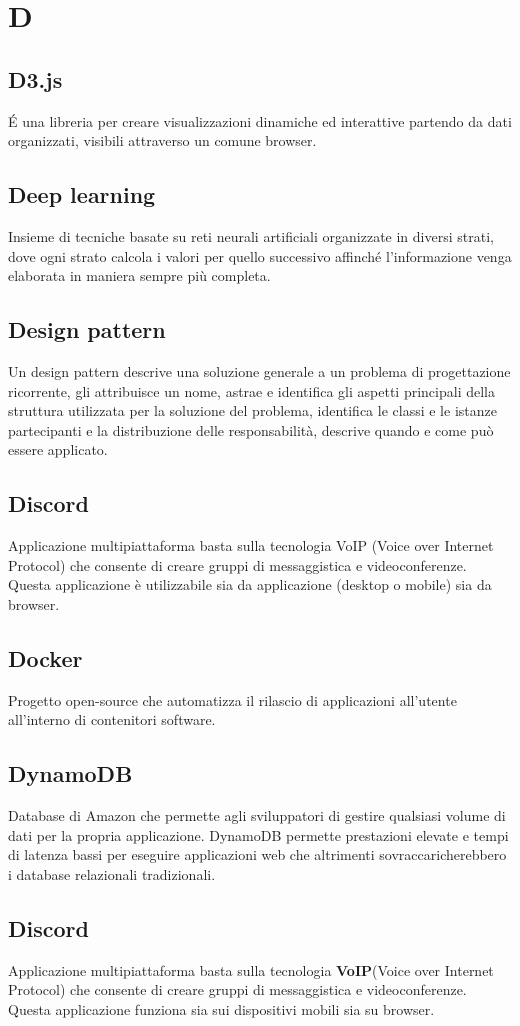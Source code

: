 \section*{D}
\markright{}
\subsection*{D3.js}
\'E una libreria  per creare visualizzazioni dinamiche ed interattive partendo da dati organizzati, visibili attraverso un comune browser.

\subsection*{Deep learning}
Insieme di tecniche basate su reti neurali artificiali organizzate in diversi strati, dove ogni strato calcola i valori per quello successivo affinché l'informazione venga elaborata in maniera sempre più completa.

\subsection*{Design pattern}
Un design pattern descrive una soluzione generale a un problema di progettazione ricorrente, gli attribuisce un nome, astrae e identifica gli aspetti principali della struttura utilizzata per la soluzione del problema, identifica le classi e le istanze partecipanti e la distribuzione delle responsabilità, descrive quando e come può essere applicato. 

\subsection*{Discord}
Applicazione multipiattaforma basta sulla tecnologia VoIP (Voice over Internet Protocol) che consente di creare gruppi di messaggistica e videoconferenze. Questa applicazione è utilizzabile sia da applicazione (desktop o mobile) sia da browser.

\subsection*{Docker}
Progetto open-source che automatizza il rilascio di applicazioni all'utente all'interno di contenitori software.

\subsection*{DynamoDB}
Database  di Amazon che permette agli sviluppatori di gestire qualsiasi volume di dati per la propria applicazione. DynamoDB permette prestazioni elevate e tempi di latenza bassi per eseguire applicazioni web che altrimenti sovraccaricherebbero i database relazionali tradizionali.

\subsection*{Discord}
Applicazione multipiattaforma basta sulla tecnologia \textbf{VoIP}(Voice over Internet Protocol) che consente di creare gruppi di messaggistica e videoconferenze. Questa applicazione funziona sia sui dispositivi mobili sia su browser.

